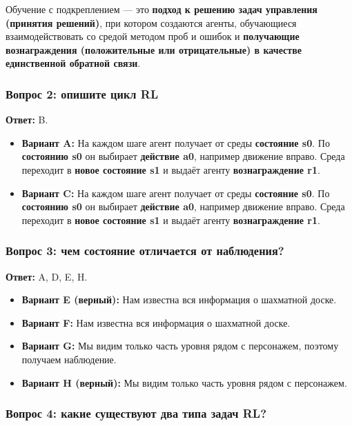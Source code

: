 \documentclass[11pt,a4paper]{article}
\begin{document}
Обучение с подкреплением --- это \textbf{подход к решению задач управления (принятия решений)}, при котором создаются агенты, обучающиеся взаимодействовать со средой методом проб и ошибок и \textbf{получающие вознаграждения (положительные или отрицательные) в качестве единственной обратной связи}.

\subsubsection{Вопрос 2: опишите цикл RL}\label{q2-define-the-rl-loop-1}

\textbf{Ответ:} B.

\begin{itemize}
\item
  \textbf{Вариант A:} На каждом шаге агент получает от среды \textbf{состояние s0}. По \textbf{состоянию s0} он выбирает \textbf{действие a0}, например движение вправо. Среда переходит в \textbf{новое состояние s1} и выдаёт агенту \textbf{вознаграждение r1}.
\item
  \textbf{Вариант C:} На каждом шаге агент получает от среды \textbf{состояние s0}. По \textbf{состоянию s0} он выбирает \textbf{действие a0}, например движение вправо. Среда переходит в \textbf{новое состояние s1} и выдаёт агенту \textbf{вознаграждение r1}.
\end{itemize}

\subsubsection{Вопрос 3: чем состояние отличается от наблюдения?}\label{q3-whats-the-difference-between-a-state-and-an-observation-1}

\textbf{Ответ:} A, D, E, H.

\begin{itemize}
\item
  \textbf{Вариант E (верный):} Нам известна вся информация о шахматной доске.
\item
  \textbf{Вариант F:} Нам известна вся информация о шахматной доске.
\item
  \textbf{Вариант G:} Мы видим только часть уровня рядом с персонажем, поэтому получаем наблюдение.
\item
  \textbf{Вариант H (верный):} Мы видим только часть уровня рядом с персонажем.
\end{itemize}

\subsubsection{Вопрос 4: какие существуют два типа задач RL?}\label{q4-a-task-is-an-instance-of-a-reinforcement-learning-problem.-what-are-the-two-types-of-tasks-1}
\end{document}
